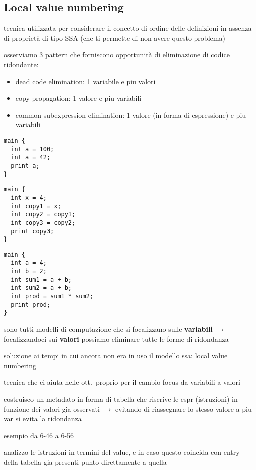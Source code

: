 \subsection{Local value numbering}

tecnica utilizzata per considerare il concetto di ordine delle definizioni in assenza di propriet\`a di tipo SSA (che ti permette di non avere questo problema)

osserviamo 3 pattern che forniscono opportunit\`a di eliminazione di codice ridondante:
\begin{itemize}
  \item dead code elimination: 1 variabile e piu valori
  \item copy propagation: 1 valore e piu variabili
  \item common subexpression elimination: 1 valore (in forma di espressione) e piu variabili
\end{itemize}

\begin{lstlisting}
main {
  int a = 100;
  int a = 42;
  print a;
}\end{lstlisting}

\begin{lstlisting}
main {
  int x = 4;
  int copy1 = x;
  int copy2 = copy1;
  int copy3 = copy2;
  print copy3;
}\end{lstlisting}

\begin{lstlisting}
main {
  int a = 4;
  int b = 2;
  int sum1 = a + b;
  int sum2 = a + b;
  int prod = sum1 * sum2;
  print prod;
}\end{lstlisting}

sono tutti modelli di computazione che si focalizzano sulle \textbf{variabili} $\rightarrow$ focalizzandoci sui \textbf{valori} possiamo eliminare tutte le forme di ridondanza

soluzione ai tempi in cui ancora non era in uso il modello ssa: local value numbering

tecnica che ci aiuta nelle ott.~proprio per il cambio focus da variabili a valori

costruisco un metadato in forma di tabella che riscrive le espr (istruzioni) in funzione dei valori gia osservati $\rightarrow$ evitando di riassegnare lo stesso valore a piu var si evita la ridondanza

esempio da 6-46 a 6-56

analizzo le istruzioni in termini del value, e in caso questo coincida con entry della tabella gia presenti punto direttamente a quella

